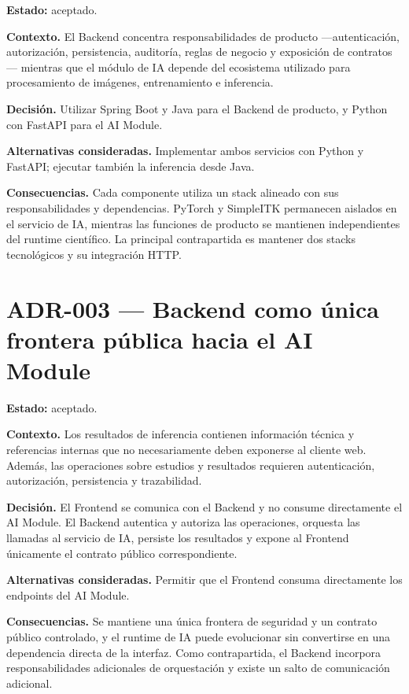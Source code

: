 \textbf{Estado:} aceptado.

\textbf{Contexto.} El Backend concentra responsabilidades de producto —autenticación, autorización, persistencia, auditoría, reglas de negocio y exposición de contratos— mientras que el módulo de IA depende del ecosistema utilizado para procesamiento de imágenes, entrenamiento e inferencia.

\textbf{Decisión.} Utilizar Spring Boot y Java para el Backend de producto, y Python con FastAPI para el AI Module.

\textbf{Alternativas consideradas.} Implementar ambos servicios con Python y FastAPI; ejecutar también la inferencia desde Java.

\textbf{Consecuencias.} Cada componente utiliza un stack alineado con sus responsabilidades y dependencias. PyTorch y SimpleITK permanecen aislados en el servicio de IA, mientras las funciones de producto se mantienen independientes del runtime científico. La principal contrapartida es mantener dos stacks tecnológicos y su integración HTTP.

\section*{ADR-003 --- Backend como única frontera pública hacia el AI Module}
\label{adr:003-backend-frontera-publica-ai}

\textbf{Estado:} aceptado.

\textbf{Contexto.} Los resultados de inferencia contienen información técnica y referencias internas que no necesariamente deben exponerse al cliente web. Además, las operaciones sobre estudios y resultados requieren autenticación, autorización, persistencia y trazabilidad.

\textbf{Decisión.} El Frontend se comunica con el Backend y no consume directamente el AI Module. El Backend autentica y autoriza las operaciones, orquesta las llamadas al servicio de IA, persiste los resultados y expone al Frontend únicamente el contrato público correspondiente.

\textbf{Alternativas consideradas.} Permitir que el Frontend consuma directamente los endpoints del AI Module.

\textbf{Consecuencias.} Se mantiene una única frontera de seguridad y un contrato público controlado, y el runtime de IA puede evolucionar sin convertirse en una dependencia directa de la interfaz. Como contrapartida, el Backend incorpora responsabilidades adicionales de orquestación y existe un salto de comunicación adicional.

